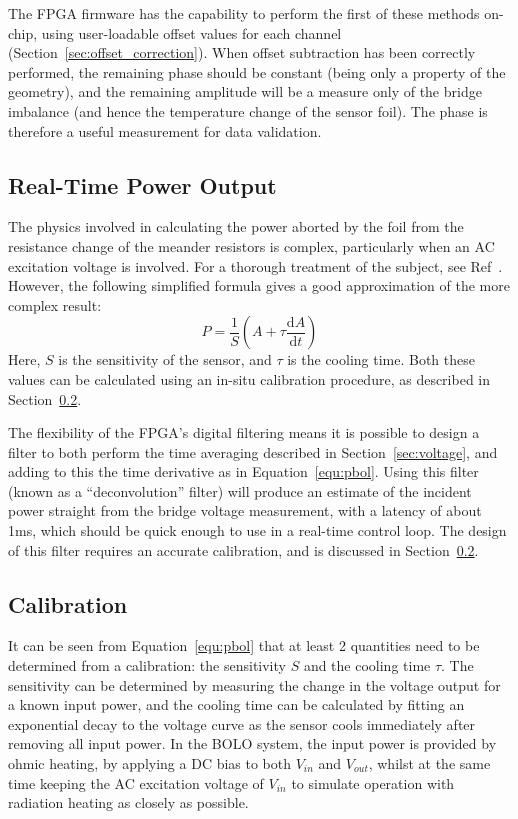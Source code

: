 \documentclass[12pt,a4paper]{article}
\begin{document}
The FPGA firmware has the capability to perform the first of these methods on-chip, using user-loadable offset values for each channel
(Section~\ref{sec:offset_correction}). When offset subtraction has been correctly performed, the remaining phase should be constant (being only a property
of the geometry), and the remaining amplitude will be a measure only of the bridge imbalance (and hence the temperature change of the sensor foil). The
phase is therefore a useful measurement for data validation.

\subsection{Real-Time Power Output}
\label{sec:rtpower}
The physics involved in calculating the power aborted by the foil from the resistance change of the meander resistors is complex, particularly when an AC
excitation voltage is involved. For a thorough treatment of the subject, see Ref~\cite{giannone-2002}. However, the following simplified formula gives a
good approximation of the more complex result:
\begin{equation}
  \label{equ:pbol}
  P = \frac{1}{S}\left(A + \tau \frac{\mathrm{d}A}{\mathrm{d}t}\right)
\end{equation}
Here, $S$ is the sensitivity of the sensor, and $\tau$ is the cooling time. Both these values can be calculated using an in-situ calibration procedure, as
described in Section~\ref{sec:calibration}.

The flexibility of the FPGA's digital filtering means it is possible to design a filter to both perform the time averaging described in
Section~\ref{sec:voltage}, and adding to this the time derivative as in Equation~\ref{equ:pbol}. Using this filter (known as a ``deconvolution'' filter)
will produce an estimate of the incident power straight from the bridge voltage measurement, with a latency of about 1ms, which should be quick enough to
use in a real-time control loop. The design of this filter requires an accurate calibration, and is discussed in Section~\ref{sec:calibration}.

\subsection{Calibration}
\label{sec:calibration}
It can be seen from Equation~\ref{equ:pbol} that at least 2 quantities need to be determined from a calibration: the sensitivity $S$ and the cooling time
$\tau$. The sensitivity can be determined by measuring the change in the voltage output for a known input power, and the cooling time can be calculated by
fitting an exponential decay to the voltage curve as the sensor cools immediately after removing all input power. In the BOLO system, the input power is
provided by ohmic heating, by applying a DC bias to both $V_{in}$ and $V_{out}$, whilst at the same time keeping the AC excitation voltage of $V_{in}$ to
simulate operation with radiation heating as closely as possible.
\end{document}
